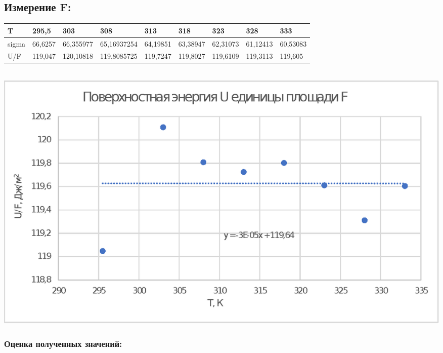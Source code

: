 \documentclass[a4paper,12pt]{article}
\theoremstyle{plain} %
\theoremstyle{definition} %
\theoremstyle{remark} %
\begin{document}
\begin{figure}[h]
\end{figure}

\subsection{Измерение F:}
\begin{tabular}{|l|l|l|l|l|l|l|l|l|}
\hline
T     & 295,5   & 303       & 308         & 313      & 318      & 323      & 328      & 333      \\ \hline
sigma & 66,6257 & 66,355977 & 65,16937254 & 64,19851 & 63,38947 & 62,31073 & 61,12413 & 60,53083 \\ \hline
U/F   & 119,047 & 120,10818 & 119,8085725 & 119,7247 & 119,8027 & 119,6109 & 119,3113 & 119,605  \\ \hline
\end{tabular}\\

\includegraphics[width=1\linewidth]{FinalGraph.eps}
\subsubsection{Оценка полученных значений:}
\end{document}
